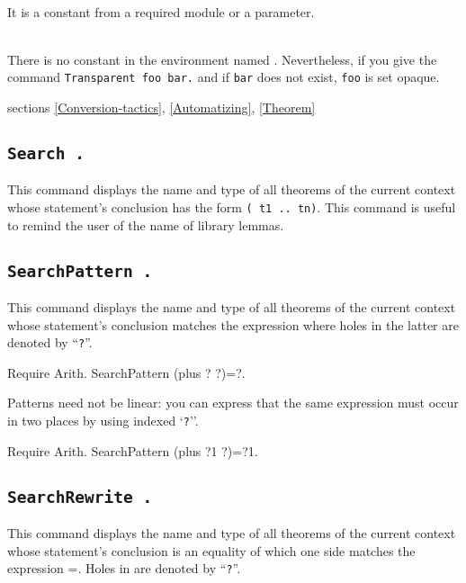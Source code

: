 \begin{ErrMsgs}
\item {}\\
    It is a constant from a required module or a parameter.
\item {\ident} \\
    There is no constant in the environment named
    \ident. Nevertheless, if you give the command \verb|Transparent foo bar.|
    and if \texttt{bar} does not exist, \texttt{foo} is set opaque.
\end{ErrMsgs}

\SeeAlso sections \ref{Conversion-tactics}, \ref{Automatizing},
\ref{Theorem}

\subsection{\tt Search {\qualid}.}
This command displays the name and type of all theorems of the current
context whose statement's conclusion has the form {\tt ({\qualid} t1 ..
  tn)}.  This command is useful to remind the user of the name of
library lemmas.

\subsection{\tt SearchPattern {\term}.}

This command displays the name and type of all theorems of the current
context whose statement's conclusion matches the expression {\term}
where holes in the latter are denoted by ``{\texttt ?}''.

\begin{coq_example}
Require Arith.
SearchPattern (plus ? ?)=?.
\end{coq_example}

Patterns need not be linear: you can express that the same
expression must occur in two places by using indexed `{\texttt ?}''.

\begin{coq_example}
Require Arith.
SearchPattern (plus ?1 ?)=?1.
\end{coq_example}

\subsection{\tt SearchRewrite {\term}.}

This command displays the name and type of all theorems of the current
context whose statement's conclusion is an equality of which one side matches
the expression {\term =}. Holes in {\term} are denoted by ``{\texttt ?}''.

